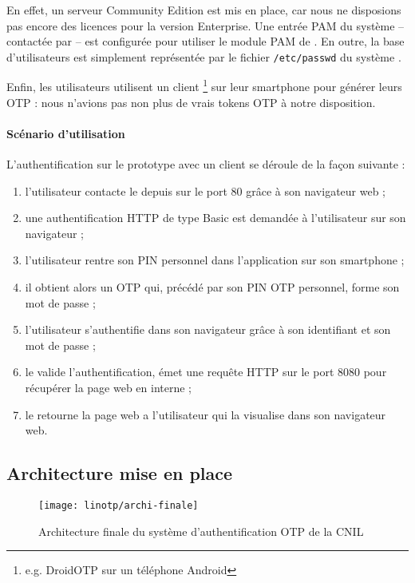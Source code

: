 En effet, un serveur \alinotp{} Community Edition est mis en place, car nous ne disposions pas encore des licences pour la version Enterprise.
Une entrée PAM du système -- contactée par \amodpam{} -- est configurée pour utiliser le module PAM de \alinotp.
En outre, la base d'utilisateurs est simplement représentée par le fichier \texttt{/etc/passwd} du système \alinux. 

Enfin, les utilisateurs utilisent un client \amotp{}\footnote{e.g. DroidOTP sur un téléphone Android} sur leur smartphone pour générer leurs OTP : nous n'avions pas non plus de vrais tokens OTP à notre disposition.

\paragraph{Scénario d'utilisation}
L'authentification sur le prototype avec un client \amotp{} se déroule de la façon suivante :

\begin{enumerate}
	\item l'utilisateur contacte le \arp{} depuis \ainternet{} sur le port 80 grâce à son navigateur web ;
	\item une authentification HTTP de type Basic est demandée à l'utilisateur sur son navigateur ;
	\item l'utilisateur rentre son PIN \amotp{} personnel dans l'application \amotp{} sur son smartphone ;
	\item il obtient alors un OTP qui, précédé par son PIN OTP personnel, forme son mot de passe ;
	\item l'utilisateur s'authentifie dans son navigateur grâce à son identifiant et son mot de passe ;
	\item le \arp{} valide l'authentification, émet une requête HTTP sur le port 8080 pour récupérer la page web en interne ;
	\item le \arp{} retourne la page web a l'utilisateur qui la visualise dans son navigateur web.
\end{enumerate}


\subsection{Architecture mise en place}
\label{section:linotp:archi-finale}

\begin{figure}
	\centering
	\texttt{[image: linotp/archi-finale]}
	\caption{Architecture finale du système d'authentification OTP de la CNIL}
	\label{figure:linotp:archi-finale}
\end{figure}

